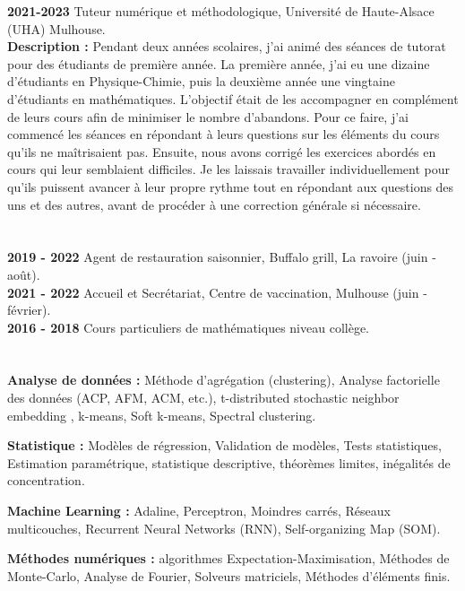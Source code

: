 \documentclass[11pt]{article}
\begin{document}
	\textbf{2021-2023} Tuteur numérique et méthodologique, Université de Haute-Alsace (UHA)  Mulhouse. \\
	\textbf{Description :} Pendant deux années scolaires, j’ai animé des séances de tutorat pour des étudiants de première année. La première année, j’ai eu une dizaine d’étudiants en Physique-Chimie, puis la deuxième année une vingtaine d’étudiants en mathématiques. L’objectif était de les accompagner en complément de leurs cours afin de minimiser le nombre d’abandons. Pour ce faire, j’ai commencé les séances en répondant à leurs questions sur les éléments du cours qu’ils ne maîtrisaient pas. Ensuite, nous avons corrigé les exercices abordés en cours qui leur semblaient difficiles. Je les laissais travailler individuellement pour qu’ils puissent avancer à leur propre rythme tout en répondant aux questions des uns et des autres, avant de procéder à une correction générale si nécessaire.     
	\section*{\color{RoyalBlue}{Expérience non académique}}
	\noindent
	\textbf{2019 - 2022} Agent de restauration saisonnier, Buffalo grill, La ravoire (juin - août). \\
	\textbf{2021 - 2022} Accueil et Secrétariat, Centre de vaccination, Mulhouse (juin - février). \\
	\textbf{2016 - 2018} Cours particuliers de mathématiques niveau collège.
	\section*{\color{RoyalBlue}{Compétences}}
	\noindent
	\textbf{Analyse de données :} Méthode d'agrégation (clustering), Analyse factorielle des données (ACP, AFM, ACM, etc.), t-distributed stochastic neighbor embedding , k-means, Soft k-means, Spectral clustering. 
	
	\textbf{Statistique :} Modèles de régression, Validation de modèles, Tests statistiques, Estimation paramétrique, statistique descriptive, théorèmes limites, inégalités de concentration.
	
	\textbf{Machine Learning :} Adaline, Perceptron, Moindres carrés, Réseaux multicouches, Recurrent Neural Networks (RNN), Self-organizing Map (SOM). 
	
	\textbf{Méthodes numériques :} algorithmes Expectation-Maximisation, Méthodes de Monte-Carlo, Analyse de Fourier,   Solveurs matriciels, Méthodes d'éléments finis.
	
\end{document}
